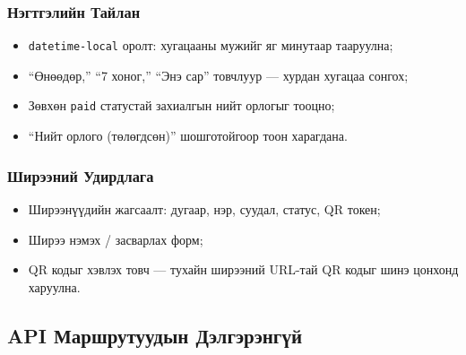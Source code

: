 \documentclass[12pt,a4paper]{article}
\begin{document}
\subsubsection{Нэгтгэлийн Тайлан}
\begin{itemize}
  \item \texttt{datetime-local} оролт: хугацааны мужийг яг минутаар тааруулна;
  \item ``Өнөөдөр,'' ``7 хоног,'' ``Энэ сар'' товчлуур --- хурдан
        хугацаа сонгох;
  \item Зөвхөн \texttt{paid} статустай захиалгын нийт орлогыг тооцно;
  \item ``Нийт орлого (төлөгдсөн)'' шошготойгоор тоон харагдана.
\end{itemize}

\subsubsection{Ширээний Удирдлага}
\begin{itemize}
  \item Ширээнүүдийн жагсаалт: дугаар, нэр, суудал, статус, QR токен;
  \item Ширээ нэмэх / засварлах форм;
  \item QR кодыг хэвлэх товч --- тухайн ширээний URL-тай QR кодыг
        шинэ цонхонд харуулна.
\end{itemize}

\subsection{API Маршрутуудын Дэлгэрэнгүй}
\end{document}
